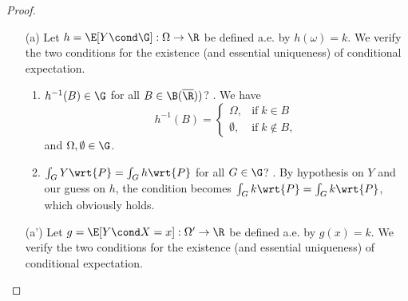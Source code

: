 \documentclass{article} %
\begin{document}
\begin{proof}
\begin{itemize}
\item[(a)] Let $h=\E[Y \cond \G]:  \Omega \to \R$ be defined a.e. by $h(\omega)=k$. We verify the two conditions for the existence (and essential uniqueness) of conditional expectation.
	\begin{enumerate}
		\item $h^{-1} (B) \in \G$ for all $B \in \B(\overline{\R}))$? \greencheck. We have 
		\[ h^{-1}(B) = 
		\begin{cases}
		\Omega, & \text{if} \; k \in B \\
		\emptyset, & \text{if} \; k \notin B,	
		\end{cases} \]
		and $\Omega, \emptyset \in \G$.
		 
		\begin{figure}[H]
		\centering	
		\end{figure}
		
		\item $\int_G Y \wrt{P} =  \int_G h \wrt{P}$ for all $G \in \G$? \greencheck.   By hypothesis on $Y$ and our guess on $h$, the condition becomes $\int_G k \wrt{P} =  \int_G k \wrt{P}$, which obviously holds.
	\end{enumerate} 
\item[(a')] Let $g=\E[Y \cond X=x]:  \Omega' \to \R$ be defined a.e. by $g(x)=k$. We verify the two conditions for the existence (and essential uniqueness) of conditional expectation.


\end{itemize}
\end{proof}
\end{document}
